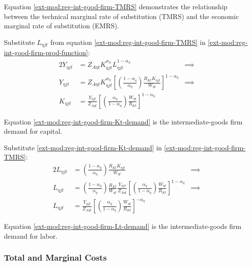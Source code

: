 \documentclass[../thesis.tex]{subfiles}
\begin{document}
Equation \ref{ext-mod:reg-int-good-firm-TMRS} demonstrates the relationship between the technical marginal rate of substitution (TMRS) and the economic marginal rate of substitution (EMRS). 

Substitute $L_{\eta jt}$ from equation \ref{ext-mod:reg-int-good-firm-TMRS} in \ref{ext-mod:reg-int-good-firm-prod-function}:
\begin{alignat}{2}
	Y_{\eta jt} & = Z_{A\eta t} K_{\eta jt}^{\alpha_{\eta}} L_{\eta jt}^{1-\alpha_{\eta}} &\implies \nonumber \\
	Y_{\eta jt} & = Z_{A\eta t} K_{\eta jt}^{\alpha_{\eta}} \left[ \left( \frac{1-\alpha_{\eta}}{{\alpha_{\eta}}} \right) \frac{R_{Kt} K_{\eta jt}}{W_{\eta t}} \right]^{1-\alpha_{\eta}} &\implies \nonumber \\
	K_{\eta jt} & = \frac{Y_{\eta jt}}{Z_{A\eta t}} \left[ \left( \frac{{\alpha_{\eta}}}{1-\alpha_{\eta}} \right) \frac{W_{\eta t}}{R_{Kt}}\right]^{1-\alpha_{\eta}} \label{ext-mod:reg-int-good-firm-Kt-demand}
\end{alignat}

Equation \ref{ext-mod:reg-int-good-firm-Kt-demand} is the intermediate-goods firm demand for capital. 

Substitute \ref{ext-mod:reg-int-good-firm-Kt-demand} in \ref{ext-mod:reg-int-good-firm-TMRS}:
\begin{alignat}{2}
	L_{\eta jt} & = \left( \frac{1-\alpha_{\eta}}{{\alpha_{\eta}}} \right) \frac{R_{Kt} K_{\eta jt}}{W_{\eta t}} &\implies \nonumber \\
	L_{\eta jt} & = \left( \frac{1-\alpha_{\eta}}{{\alpha_{\eta}}} \right) \frac{R_{Kt}}{W_{\eta t}} \frac{Y_{\eta jt}}{Z_{A\eta t}} \left[ \left( \frac{{\alpha_{\eta}}}{1-\alpha_{\eta}} \right) \frac{W_{\eta t}}{R_{Kt}}\right]^{1-\alpha_{\eta}} &\implies \nonumber \\
	L_{\eta jt} & = \frac{Y_{\eta jt}}{Z_{A\eta t}} \left[ \left( \frac{{\alpha_{\eta}}}{1-\alpha_{\eta}} \right) \frac{W_{\eta t}}{R_{Kt}}\right]^{-{\alpha_{\eta}}} \label{ext-mod:reg-int-good-firm-Lt-demand}
\end{alignat}

Equation \ref{ext-mod:reg-int-good-firm-Lt-demand} is the intermediate-goods firm demand for labor.

\subsubsection*{Total and Marginal Costs}
\end{document}

